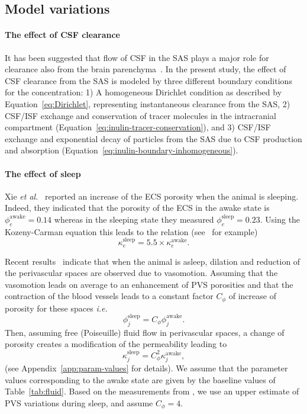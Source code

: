 \documentclass[10pt]{article}
\newcommand{\ie}{\emph{i.e.}\;}
\newcommand{\etal}{\emph{et al.}\;}
\newcommand{\1}{^{(1)}}
\newcommand{\2}{^{(2)}}
\begin{document}
\subsection{Model variations}\label{subsec:var}
\paragraph{The effect of CSF clearance}
It has been suggested that flow of CSF in the SAS plays a major role for clearance also from the brain parenchyma~\cite{proulx2021cerebrospinal, hornkjol2022csf}. In the present study, the effect of CSF clearance from the SAS is modeled by three different boundary conditions for the concentration: 1) A homogeneous Dirichlet condition as described by Equation~\eqref{eq:Dirichlet}, representing instantaneous clearance from the SAS, 2) CSF/ISF exchange and conservation of tracer molecules in the intracranial compartment (Equation~\eqref{eq:inulin-tracer-conservation}), and 3) CSF/ISF exchange and exponential decay of particles from the SAS due to CSF production and absorption (Equation~\eqref{eq:inulin-boundary-inhomogeneous}).

\paragraph{The effect of sleep}
Xie \etal~\cite{Xie_2013_sleep} reported an increase of the ECS porosity when the animal is sleeping. Indeed, they indicated that the porosity of the ECS in the awake state is $\phi_e^\text{awake} = 0.14$ whereas in the sleeping state they measured $\phi_e^\text{sleep}=0.23$. Using the Kozeny-Carman equation this leads to the relation (see~\cite{tithof-2022-glymphatic} for example)
\[
    \kappa_e^{\text{sleep}}= 5.5\times \kappa_e^\text{awake}.
\]

Recent results~\cite{Bojarskaite2022} indicate that when the animal is asleep, dilation and reduction  of the perivascular spaces are observed due to vasomotion. Assuming that the vasomotion leads on average to an enhancement of PVS porosities and that the contraction of the blood vessels leads to a constant factor $C_\phi$ of increase of porosity for these spaces \ie 
\[
    \phi^\text{sleep}_j = C_\phi \phi_j^\text{awake}.
\]
Then, assuming free (Poiseuille) fluid flow in perivascular spaces, a change of porosity creates a modification of the permeability leading to 
\[
    \kappa_j^\text{sleep} = C_\phi^2 \kappa_j^\text{awake},
\]
(see Appendix~\ref{app:param-values} for details).
We assume that the parameter values corresponding to the awake state are given by the baseline values of Table~\ref{tab:fluid}. Based on the measurements from \cite{Bojarskaite2022}, we use an upper estimate of PVS variations during sleep, and assume $C_\phi=4$.
\end{document}
